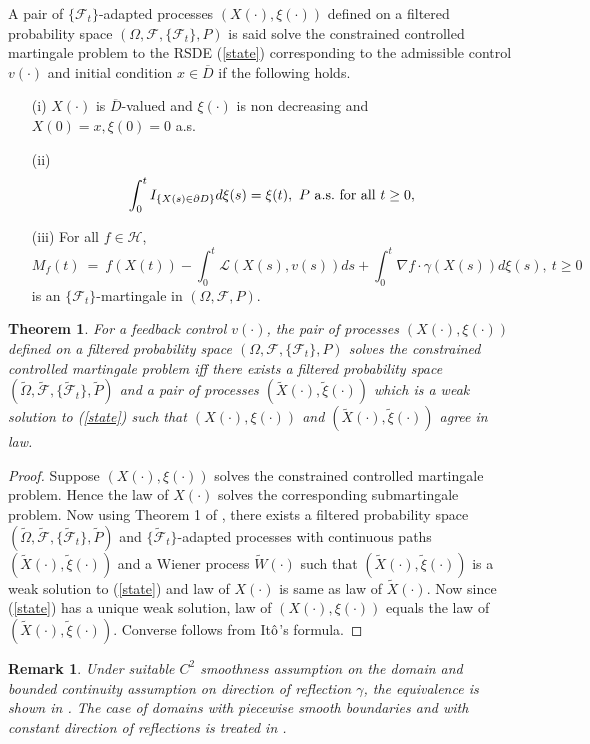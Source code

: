 \documentclass[11pt]{amsart}
\newtheorem{theorem}{\bf Theorem}[section]
\newtheorem{remark}{\bf Remark}[section]
\numberwithin{equation}{section}
\begin{document}
 A pair of $\{ \mathcal {F}_t\}$-adapted processes $(X(\cdot), \xi(\cdot))$ 
defined on a filtered probability space $(\Omega, {\mathcal F}, \{\mathcal{F}_t \}, P)$
is said solve the constrained controlled martingale problem to  the RSDE (\ref{state}) corresponding
to the admissible control $v(\cdot)$ and initial condition $x \in \overline{D}$ if the following holds.
\begin{itemize}
\item [{(i)}] $X(\cdot)$ is $\overline{D}$-valued and $\xi(\cdot)$ is non decreasing and $X(0) = x, 
\xi(0) =0 $ a.s.
\item [{(ii)}] 
\[
\int^t_0 I_{\{ X(s) \in \partial D \} } d \xi(s) = \xi(t), \ P \ {\rm a.s. \ for\ all} \  t \geq  0,
\]
\item [{(iii)}] For all $ f \in \mathcal {H}$,
\[
M_f (t) \ = \ f(X(t)) - \int^t_0 \mathcal {L} (X(s), v(s)) ds + \int^t_0 \nabla f \cdot \gamma(X(s)) d \xi (s),
\ t \geq 0
\]
is an $\{ \mathcal{F}_t\}$-martingale in $(\Omega, \mathcal{F}, P)$.
\end{itemize}
\begin{theorem} For a feedback  control $v(\cdot)$, the pair of processes $(X(\cdot), \xi(\cdot))$ 
defined on a filtered probability space $(\Omega, {\mathcal F}, \{\mathcal{F}_t \}, P)$ solves the 
constrained controlled martingale problem iff there exists a filtered probability space \\   
$(\tilde{\Omega}, \tilde{{\mathcal F}}, \{ \tilde{\mathcal{F}}_t \}, \tilde{P})$ and a pair of 
processes $(\tilde{X}(\cdot), \tilde{\xi}(\cdot))$ which is a weak solution to (\ref{state}) 
such that $(X(\cdot), \xi(\cdot))$  and $(\tilde{X}(\cdot), \tilde{\xi}(\cdot))$ agree in law.
\end{theorem}
\begin{proof} Suppose  $(X(\cdot), \xi(\cdot))$ solves the constrained controlled martingale problem.
Hence the law  of $X(\cdot)$ solves the corresponding submartingale problem. Now using Theorem 1 of \cite{Kavithaetal2014}, there exists a filtered probability space 
$(\tilde{\Omega}, \tilde{\mathcal {F}}, \{ \tilde{ \mathcal{F}}_t \}, \tilde{P})$ and 
$\{ \tilde{ \mathcal{F}}_t \}$-adapted processes with continuous paths
$(\tilde{X}(\cdot), \tilde{\xi}(\cdot))$ and a Wiener process $\tilde{W}(\cdot)$ such that 
$(\tilde{X}(\cdot), \tilde{\xi}(\cdot))$ is a weak solution to (\ref{state}) and law  of $X(\cdot)$ is same as
law of $\tilde{X}(\cdot)$. Now since (\ref{state}) has a unique weak solution, law of $(X(\cdot), \xi(\cdot))$ 
equals the law  of $(\tilde{X}(\cdot), \tilde{\xi}(\cdot))$. Converse follows from It$\hat{\rm o}$'s 
formula.
\end{proof}
\begin{remark}
Under suitable $C^2$ smoothness assumption on the domain and bounded continuity
assumption on  direction of reflection $\gamma$, the equivalence is shown in \cite{stroock_varadhan}.
The case of domains with piecewise smooth boundaries and with constant direction of
reflections is treated in  \cite{Budhiraja}. 
\end{remark}
\end{document}
